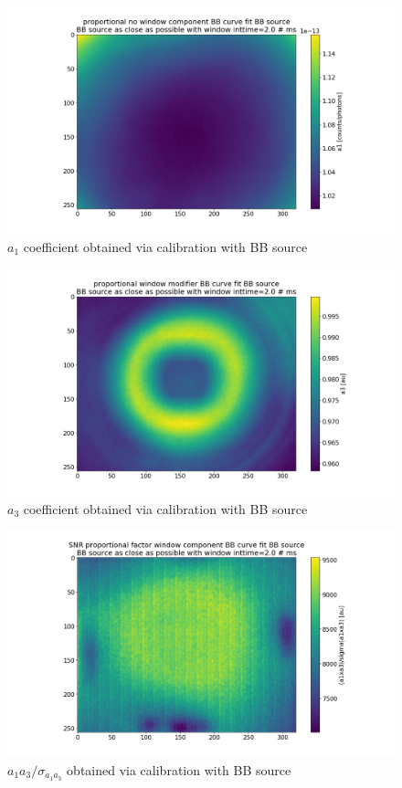 \begin{figure}
	\centering
	\includegraphics[width=\linewidth]{Chapters/appendix1/figs/calib_a1.png}
	\caption{$a_1$ coefficient obtained via calibration with BB source}
	\label{fig:BBcaliba1}
\end{figure}
\begin{figure}
	\centering
	\includegraphics[width=\linewidth]{Chapters/appendix1/figs/calib_a3.png}
	\caption{$a_3$ coefficient obtained via calibration with BB source}
	\label{fig:BBcaliba3}
\end{figure}
\begin{figure}
	\centering
	\includegraphics[width=\linewidth]{Chapters/appendix1/figs/calib_a1a3SNR.png}
	\caption{$a_1 a_3 / \sigma_{a_1 a_3}$ obtained via calibration with BB source}
	\label{fig:BBcaliba1a3SNR}
\end{figure}

